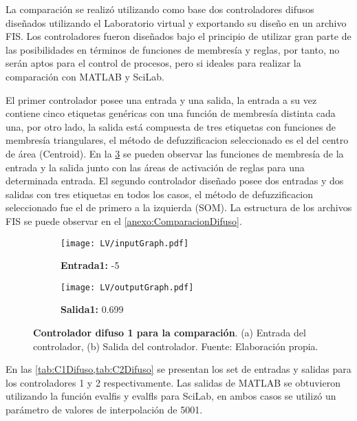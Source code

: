         La comparación se realizó utilizando como base dos controladores difusos diseñados utilizando el Laboratorio virtual y exportando su diseño en un archivo FIS. Los controladores fueron diseñados bajo el principio de utilizar gran parte de las posibilidades en términos de funciones de membresía y reglas, por tanto, no serán aptos para el control de procesos, pero si ideales para realizar la comparación con MATLAB y SciLab.

        El primer controlador posee una entrada y una salida, la entrada a su vez contiene cinco etiquetas genéricas con una función de membresía distinta cada una, por otro lado, la salida está compuesta de tres etiquetas con funciones de membresía triangulares, el método de defuzzificacion seleccionado es el del centro de área (Centroid). En la \cref{fig:controladorDifuso} se pueden observar las funciones de membresía de la entrada y la salida junto con las áreas de activación de reglas para una determinada entrada. El segundo controlador diseñado posee dos entradas y dos salidas con tres etiquetas en todos los casos, el método de defuzzificacion seleccionado fue el de primero a la izquierda (SOM). La estructura de los archivos FIS se puede observar en el \ref{anexo:ComparacionDifuso}.

        \vspace{10pt}

        \begin{figure}[htb]
            \centering
            \begin{subfigure}[t]{0.49\textwidth}
                \centering
                \texttt{[image: LV/inputGraph.pdf]}
                \caption{\textbf{Entrada1:} -5}
                \label{fig:inputGraph}
            \end{subfigure}
            \hfill
            \begin{subfigure}[t]{0.49\textwidth}
                \centering
                \texttt{[image: LV/outputGraph.pdf]}
                \caption{\textbf{Salida1:} 0.699}
                \label{fig:outputGraph}
            \end{subfigure}
            
            \caption[Controlador difuso 1 para la comparación]{\textbf{Controlador difuso 1 para la comparación}. (a) Entrada del controlador, (b) Salida del controlador. Fuente: Elaboración propia. \label{fig:controladorDifuso}}
        \end{figure}

        En las \cref{tab:C1Difuso,tab:C2Difuso} se presentan los set de entradas y salidas para los controladores 1 y 2 respectivamente. Las salidas de MATLAB se obtuvieron utilizando la función evalfis y evalfls para SciLab, en ambos casos se utilizó un parámetro de valores de interpolación de 5001.

